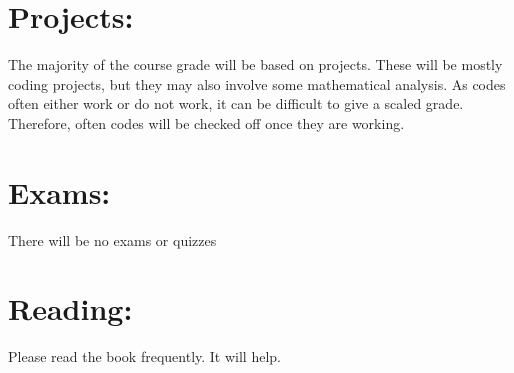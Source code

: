 \documentclass[margin]{res}
\theoremstyle{plain}
\theoremstyle{definition}
\theoremstyle{remark}
\begin{document}
\begin{resume}
% 

\section{Projects:} 
The majority of the course grade will be based on projects.  These will be mostly coding projects, but they may also involve some mathematical analysis.  As codes often either work or do not work, it can be difficult to give a scaled grade.  Therefore, often codes will be checked off once they are working.  

\section{Exams:}
There will be no exams or quizzes

\section{Reading:} 
Please read the book frequently.  It will help.


\end{resume}
\end{document}
